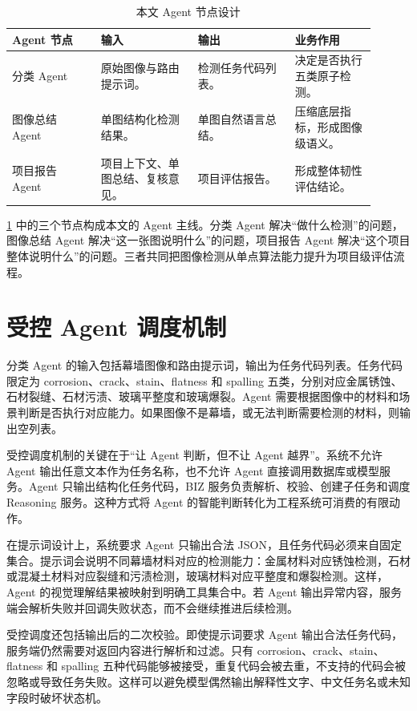 \begin{table}[!htb]
  \caption{本文 Agent 节点设计}\label{tab:agent-node-design}
  \centering
  \begin{tabular}{@{}p{0.22\linewidth}p{0.24\linewidth}p{0.24\linewidth}p{0.20\linewidth}@{}} \toprule
    \textbf{Agent 节点} & \textbf{输入} & \textbf{输出} & \textbf{业务作用} \\ \midrule
    分类 Agent & 原始图像与路由提示词。 & 检测任务代码列表。 & 决定是否执行五类原子检测。 \\
    图像总结 Agent & 单图结构化检测结果。 & 单图自然语言总结。 & 压缩底层指标，形成图像级语义。 \\
    项目报告 Agent & 项目上下文、单图总结、复核意见。 & 项目评估报告。 & 形成整体韧性评估结论。 \\ \bottomrule
  \end{tabular}
\end{table}

\cref{tab:agent-node-design} 中的三个节点构成本文的 Agent 主线。分类 Agent 解决“做什么检测”的问题，图像总结 Agent 解决“这一张图说明什么”的问题，项目报告 Agent 解决“这个项目整体说明什么”的问题。三者共同把图像检测从单点算法能力提升为项目级评估流程。

\section{受控 Agent 调度机制}
\label{sec:controlled-agent-routing}

分类 Agent 的输入包括幕墙图像和路由提示词，输出为任务代码列表。任务代码限定为 corrosion、crack、stain、flatness 和 spalling 五类，分别对应金属锈蚀、石材裂缝、石材污渍、玻璃平整度和玻璃爆裂。Agent 需要根据图像中的材料和场景判断是否执行对应能力。如果图像不是幕墙，或无法判断需要检测的材料，则输出空列表。

受控调度机制的关键在于“让 Agent 判断，但不让 Agent 越界”。系统不允许 Agent 输出任意文本作为任务名称，也不允许 Agent 直接调用数据库或模型服务。Agent 只输出结构化任务代码，BIZ 服务负责解析、校验、创建子任务和调度 Reasoning 服务。这种方式将 Agent 的智能判断转化为工程系统可消费的有限动作。

在提示词设计上，系统要求 Agent 只输出合法 JSON，且任务代码必须来自固定集合。提示词会说明不同幕墙材料对应的检测能力：金属材料对应锈蚀检测，石材或混凝土材料对应裂缝和污渍检测，玻璃材料对应平整度和爆裂检测。这样，Agent 的视觉理解结果被映射到明确工具集合中。若 Agent 输出异常内容，服务端会解析失败并回调失败状态，而不会继续推进后续检测。

受控调度还包括输出后的二次校验。即使提示词要求 Agent 输出合法任务代码，服务端仍然需要对返回内容进行解析和过滤。只有 corrosion、crack、stain、flatness 和 spalling 五种代码能够被接受，重复代码会被去重，不支持的代码会被忽略或导致任务失败。这样可以避免模型偶然输出解释性文字、中文任务名或未知字段时破坏状态机。

